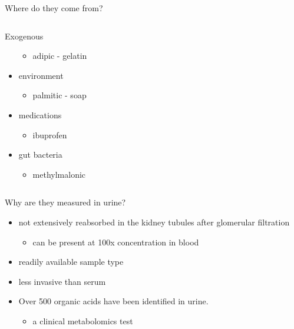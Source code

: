 \documentclass[presentation]{beamer}
\begin{document}
\begin{frame}[label={sec:orgheadline6}]{Where do they come from?}
\begin{columns}
\begin{column}{0.5\columnwidth}
\begin{block}{Exogenous}
\begin{itemize}
\begin{itemize}
\item adipic - gelatin
\end{itemize}
\item environment
\begin{itemize}
\item palmitic - soap
\end{itemize}
\item medications
\begin{itemize}
\item ibuprofen
\end{itemize}
\item gut bacteria
\begin{itemize}
\item methylmalonic
\end{itemize}
\end{itemize}
\end{block}
\end{column}
\end{columns}
\end{frame}

\begin{frame}[label={sec:orgheadline7}]{Why are they measured in urine?}
\begin{itemize}
\item not extensively reabsorbed in the kidney tubules after glomerular
filtration
\begin{itemize}
\item can be present at 100x concentration in blood
\end{itemize}
\item readily available sample type
\item less invasive than serum
\item Over 500 organic acids have been identified in urine.
\begin{itemize}
\item a clinical metabolomics test
\end{itemize}
\end{itemize}
\end{frame}
\end{document}
